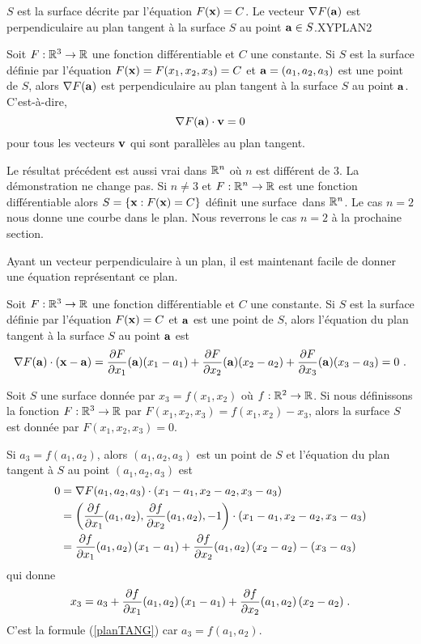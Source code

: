 {
{$S$ est la surface décrite par l'équation $F(\mathbf{x})= C$.   Le
vecteur $\nabla F(\mathbf{a})$ est perpendiculaire au plan tangent à la
surface $S$ au point $\mathbf{a} \in S$.}{XYPLAN2}

\begin{prop}
Soit $F:\mathbb{R}^3\rightarrow \mathbb{R}$ une fonction différentiable et $C$ une
constante.  Si $S$ est la surface définie par l'équation
$F(\mathbf{x})=F(x_1,x_2,x_3)=C$ et $\mathbf{a}=(a_1,a_2,a_3)$ est une point
de $S$, alors $\nabla F(\mathbf{a})$ est perpendiculaire au plan tangent à
la surface $S$ au point $\mathbf{a}$.  C'est-à-dire,
\[
\nabla F(\mathbf{a})\cdot \mathbf{v} = 0
\]
pour tous les vecteurs $\mathbf{v}$ qui sont parallèles au plan tangent.
\end{prop}

\begin{rmk}
Le résultat précédent est aussi vrai dans $\mathbb{R}^n$ où $n$ est différent
de $3$.  La démonstration ne change pas.  Si $n\neq 3$ et
$F:\mathbb{R}^n \rightarrow \mathbb{R}$ est une fonction différentiable alors
$S = \{ \mathbf{x} : F(\mathbf{x})=C \}$ définit une \flqq surface\frqq\ 
dans $\mathbb{R}^n$.  Le cas $n=2$ nous donne une courbe dans le plan.  Nous
reverrons le cas $n=2$ à la prochaine section.
\label{orthogGRAD}
\end{rmk}

Ayant un vecteur perpendiculaire à un plan, il est maintenant facile de
donner une équation représentant ce plan.

\begin{prop}
Soit $F:\mathbb{R}^3\rightarrow \mathbb{R}$ une fonction différentiable et $C$ une
constante.  Si $S$ est la surface définie par l'équation $F(\mathbf{x})=C$ et
$\mathbf{a}$ est une point de $S$, alors l'équation du plan tangent à la
surface $S$ au point $\mathbf{a}$ est 
\[
\nabla F(\mathbf{a})\cdot (\mathbf{x} - \mathbf{a}) =
\frac{\partial F}{\partial x_1}(\mathbf{a})(x_1-a_1) + \frac{\partial F}{\partial x_2}(\mathbf{a})(x_2-a_2)
+\frac{\partial F}{\partial x_3}(\mathbf{a})(x_3-a_3)=0 \ .
\]
\end{prop}

\begin{rmk}
Soit $S$ une surface donnée par $x_3=f(x_1,x_2)$ où
$f:\mathbb{R}^2\rightarrow \mathbb{R}$.  Si nous définissons la fonction
$F:\mathbb{R}^3 \rightarrow \mathbb{R}$ par $F(x_1,x_2,x_3) = f(x_1,x_2) - x_3$,
alors la surface $S$ est donnée par $F(x_1,x_2,x_3)=0$.

Si $a_3=f(a_1,a_2)$, alors $(a_1,a_2,a_3)$ est un point de $S$ et
l'équation du plan tangent à $S$ au point $(a_1,a_2,a_3)$ est
\begin{align*}
0 &= \nabla F(a_1,a_2,a_3)\cdot (x_1-a_1,x_2-a_2,x_3-a_3) \\
&= \left(\frac{\partial f}{\partial x_1}(a_1,a_2), \frac{\partial f}{\partial x_2}(a_1,a_2), -1\right)
\cdot (x_1-a_1,x_2-a_2,x_3-a_3) \\
&= \frac{\partial f}{\partial x_1}(a_1,a_2) \,(x_1-a_1) + \frac{\partial f}{\partial x_2}(a_1,a_2)\,(x_2-a_2)
-(x_3-a_3)
\end{align*}
qui donne
\[
x_3 = a_3 + \frac{\partial f}{\partial x_1}(a_1,a_2) \,(x_1-a_1)
+ \frac{\partial f}{\partial x_2}(a_1,a_2)\,(x_2-a_2) \; .
\]
C'est la formule (\ref{planTANG}) car $a_3 = f(a_1,a_2)$.
\end{rmk}

}
